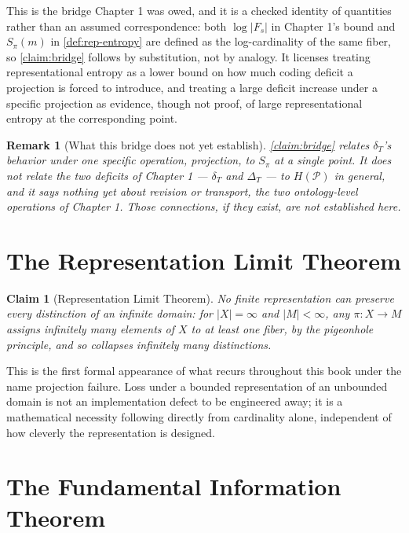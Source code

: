 \documentclass[12pt]{report}
\newtheorem{claim}[definition]{Claim}
\newtheorem{remark}[definition]{Remark}
\begin{document}
This is the bridge Chapter 1 was owed, and it is a checked identity of
quantities rather than an assumed correspondence: both
$\log|F_s|$ in Chapter 1's bound and $S_\pi(m)$ in
\cref{def:rep-entropy} are defined as the log-cardinality of the same
fiber, so \cref{claim:bridge} follows by substitution, not by analogy.
It licenses treating representational entropy as a lower bound on how
much coding deficit a projection is forced to introduce, and treating a
large deficit increase under a specific projection as evidence, though
not proof, of large representational entropy at the corresponding point.

\begin{remark}[What this bridge does not yet establish]
\label{rem:bridge-limits}
\cref{claim:bridge} relates $\delta_T$'s behavior under one specific
operation, projection, to $S_\pi$ at a single point. It does not relate
the two deficits of Chapter 1 --- $\delta_T$ and $\Delta_T$ --- to
$H(\mathcal{P})$ in general, and it says nothing yet about revision or
transport, the two ontology-level operations of Chapter 1. Those
connections, if they exist, are not established here.
\end{remark}

\section{The Representation Limit Theorem}
\label{sec:rep-limit}

\begin{claim}[Representation Limit Theorem]
\label{thm:rep-limit}
No finite representation can preserve every distinction of an infinite
domain: for $|X| = \infty$ and $|M| < \infty$, any $\pi : X \to M$ assigns
infinitely many elements of $X$ to at least one fiber, by the pigeonhole
principle, and so collapses infinitely many distinctions.
\end{claim}

This is the first formal appearance of what recurs throughout this book
under the name projection failure. Loss under a bounded representation of
an unbounded domain is not an implementation defect to be engineered
away; it is a mathematical necessity following directly from cardinality
alone, independent of how cleverly the representation is designed.

\section{The Fundamental Information Theorem}
\label{sec:fund-info}
\end{document}
